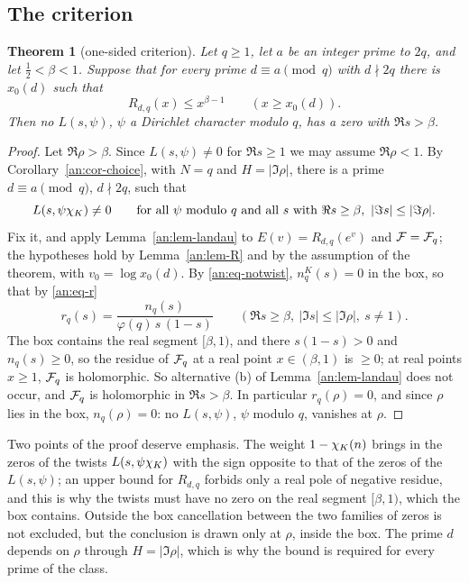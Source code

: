 \documentclass[10pt]{amsart}
\newtheorem{theorem}{Theorem}[section]
\theoremstyle{definition}
\theoremstyle{remark}
\begin{document}
\subsection{The criterion}\label{an:ssec-criterion}
\begin{theorem}[one-sided criterion]\label{an:thm-criterion}
Let $q\ge1$, let $a$ be an integer prime to $2q$, and let $\frac12<\beta<1$.
Suppose that for every prime $d\equiv a\pmod{q}$ with $d\nmid2q$ there is
$x_0(d)$ such that
\[
 R_{d,q}(x)\le x^{\beta-1}\qquad(x\ge x_0(d)).
\]
Then no $L(s,\psi)$, $\psi$ a Dirichlet character modulo $q$, has a zero with
$\Re s>\beta$.
\end{theorem}
\begin{proof}
Let $\Re\rho>\beta$. Since $L(s,\psi)\ne0$ for $\Re s\ge1$ we may assume
$\Re\rho<1$. By Corollary~\ref{an:cor-choice}, with $N=q$ and
$H=|\Im\rho|$, there is a prime $d\equiv a\pmod q$, $d\nmid 2q$, such that
\begin{equation}\label{an:eq-notwist}
 L(s,\psi\chi_K)\ne0\qquad\text{for all $\psi$ modulo $q$ and all $s$ with }\Re s\ge\beta,\ |\Im s|\le|\Im\rho| .
\end{equation}
Fix it, and apply Lemma~\ref{an:lem-landau} to $E(v)=R_{d,q}(e^{v})$ and
$\mathcal F=\mathcal F_q$; the hypotheses hold by Lemma~\ref{an:lem-R} and by the
assumption of the theorem, with $v_0=\log x_0(d)$. By \eqref{an:eq-notwist},
$n_q^{K}(s)=0$ in the box, so that by \eqref{an:eq-r}
\[
 r_q(s)=\frac{n_q(s)}{\varphi(q)\,s\,(1-s)}\qquad(\Re s\ge\beta,\ |\Im s|\le|\Im\rho|,\ s\ne1).
\]
The box contains the real segment $[\beta,1)$, and there $s(1-s)>0$ and
$n_q(s)\ge0$, so the residue of $\mathcal F_q$ at a real point $x\in(\beta,1)$ is
$\ge0$; at real points $x\ge1$, $\mathcal F_q$ is holomorphic. So alternative (b)
of Lemma~\ref{an:lem-landau} does not occur, and $\mathcal F_q$ is holomorphic in
$\Re s>\beta$. In particular $r_q(\rho)=0$, and since $\rho$ lies in the
box, $n_q(\rho)=0$: no $L(s,\psi)$, $\psi$ modulo $q$, vanishes at $\rho$.
\end{proof}
Two points of the proof deserve emphasis. The weight $1-\chi_K(n)$ brings in
the zeros of the twists $L(s,\psi\chi_K)$ with the sign opposite to that of
the zeros of the $L(s,\psi)$; an upper bound for $R_{d,q}$ forbids only a
real pole of negative residue, and this is why the twists must have no zero
on the real segment $[\beta,1)$, which the box contains. Outside the box
cancellation between the two families of zeros is not excluded, but the
conclusion is drawn only at $\rho$, inside the box. The prime $d$ depends on
$\rho$ through $H=|\Im\rho|$, which is why the bound is required for every
prime of the class.
\end{document}

